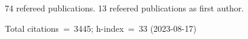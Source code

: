 74 refereed publications. 13 refeered publications as first author.

Total citations~=~3445; h-index~=~33 (2023-08-17)